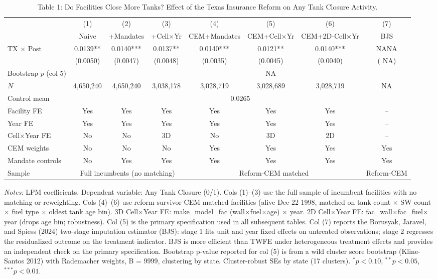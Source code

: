 \begin{table}[htbp]
\centering
\caption{Table 1: Do Facilities Close More Tanks? Effect of the Texas Insurance Reform on Any Tank Closure Activity.}
\label{tab:t1_any_closure}
\begin{tabular}{lccccccc}
\toprule
 & (1) & (2) & (3) & (4) & (5) & (6) & (7) \\
 & Naive & +Mandates & +Cell$\times$Yr & CEM+Mandates & CEM+Cell$\times$Yr & CEM+2D-Cell$\times$Yr & BJS \\
\midrule
TX $\times$ Post & 0.0139** & 0.0140*** & 0.0137** & 0.0140*** & 0.0121** & 0.0140*** &    NANA \\
                  & (0.0050) & (0.0047) & (0.0048) & (0.0035) & (0.0045) & (0.0040) & (   NA) \\
Bootstrap $p$ (col 5) & \multicolumn{4}{c}{} &   NA & \multicolumn{2}{c}{} \\
$N$               & 4,650,240 & 4,650,240 & 3,038,178 & 3,028,719 & 3,028,689 & 3,028,719 & NA \\
Control mean      & \multicolumn{7}{c}{0.0265} \\
\midrule
Facility FE              & Yes & Yes & Yes & Yes & Yes & Yes & -- \\
Year FE                  & Yes & Yes & Yes & Yes & Yes & Yes & -- \\
Cell$\times$Year FE     & No  & No  & 3D  & No  & 3D  & 2D  & -- \\
CEM weights              & No  & No  & No  & Yes & Yes & Yes & Yes \\
Mandate controls         & No  & Yes & Yes & Yes & Yes & Yes & Yes \\
Sample & \multicolumn{3}{c}{Full incumbents (no matching)} & \multicolumn{3}{c}{Reform-CEM matched} & Reform-CEM \\
\bottomrule
\end{tabular}
\begin{minipage}{\linewidth}
\small
\textit{Notes:} LPM coefficients. Dependent variable: Any Tank Closure (0/1). Cols (1)--(3) use the full sample of incumbent facilities with no matching or reweighting. Cols (4)--(6) use reform-survivor CEM matched facilities (alive Dec 22 1998, matched on tank count $\times$ SW count $\times$ fuel type $\times$ oldest tank age bin). 3D Cell$\times$Year FE: make\_model\_fac (wall$\times$fuel$\times$age) $\times$ year. 2D Cell$\times$Year FE: fac\_wall$\times$fac\_fuel$\times$year (drops age bin; robustness). Col (5) is the primary specification used in all subsequent tables. Col (7) reports the Borusyak, Jaravel, and Spiess (2024) two-stage imputation estimator (BJS): stage 1 fits unit and year fixed effects on untreated observations; stage 2 regresses the residualized outcome on the treatment indicator. BJS is more efficient than TWFE under heterogeneous treatment effects and provides an independent check on the primary specification. Bootstrap p-value reported for col (5) is from a wild cluster score bootstrap (Kline-Santos 2012) with Rademacher weights, B = 9999, clustering by state. Cluster-robust SEs by state (17 clusters). $^{*}p<0.10$, $^{**}p<0.05$, $^{***}p<0.01$.
\end{minipage}
\end{table}
